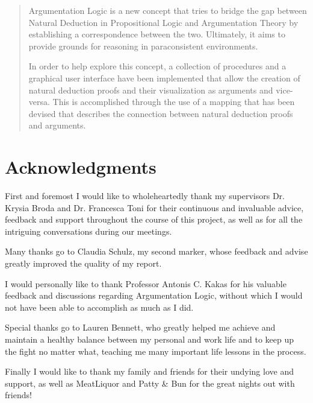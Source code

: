 \documentclass[11pt,twoside,a4paper]{report}
\begin{document}
\cleardoublepage

\begin{abstract}
Argumentation Logic is a new concept that tries to bridge the gap between Natural Deduction in Propositional Logic and Argumentation Theory by establishing a correspondence between the two. Ultimately, it aims to provide grounds for reasoning in paraconsistent environments.

\noindent In order to help explore this concept, a collection of procedures and a graphical user interface have been implemented that allow the creation of natural deduction proofs and their visualization as arguments and vice-versa. This is accomplished through the use of a mapping that has been devised that describes the connection between natural deduction proofs and arguments.
\end{abstract}

\cleardoublepage

\chapter*{Acknowledgments}
First and foremost I would like to wholeheartedly thank my supervisors Dr. Krysia Broda and Dr. Francesca Toni for their continuous and invaluable advice, feedback and support throughout the course of this project, as well as for all the intriguing conversations during our meetings.

\medskip
\noindent Many thanks go to Claudia Schulz, my second marker, whose feedback and advise greatly improved the quality of my report.

\medskip
\noindent I would personally like to thank Professor Antonis C. Kakas for his valuable feedback and discussions regarding Argumentation Logic, without which I would not have been able to accomplish as much as I did.

\medskip
\noindent Special thanks go to Lauren Bennett, who greatly helped me achieve and maintain a healthy balance between my personal and work life and to keep up the fight no matter what, teaching me many important life lessons in the process.

\medskip
\noindent Finally I would like to thank my family and friends for their undying love and support, as well as MeatLiquor and Patty \& Bun for the great nights out with friends!

\cleardoublepage
\tableofcontents

\clearpage
\renewcommand{\headrulewidth}{1pt}
\renewcommand{\footrulewidth}{0.5pt}
\fancyhf{}
\fancyhead[RE,LO]{\small\nouppercase{\leftmark}}
\fancyhead[LE,RO]{\small\nouppercase{\rightmark}}
\fancyfoot[CE,CO]{\thepage}
\end{document}
